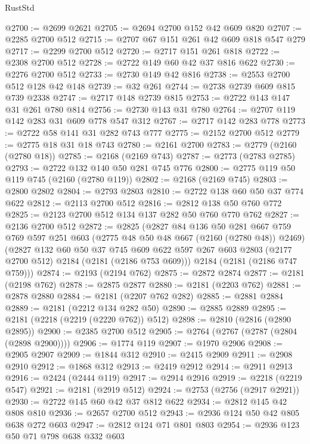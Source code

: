 \begin{lexlean}{RustStd}
\begin{coremodule}
@2700 := @2699 @2621
@2705 := @2694 @2700 @152 @42 @609 @820
@2707 := @2285 @2700 @512
@2715 := @2707 @67 @151 @261 @42 @609 @818 @547 @279
@2717 := @2299 @2700 @512
@2720 := @2717 @151 @261 @818
@2722 := @2308 @2700 @512
@2728 := @2722 @149 @60 @42 @37 @816 @622
@2730 := @2276 @2700 @512
@2733 := @2730 @149 @42 @816
@2738 := @2553 @2700 @512 @128 @42 @148
@2739 := @32 @261
@2744 := @2738 @2739 @609 @815 @739 @2338
@2747 := @2717 @148 @2739 @815
@2753 := @2722 @143 @147 @31 @261 @780 @814
@2756 := @2730 @143 @31 @780
@2764 := @2707 @119 @142 @283 @31 @609 @778 @547 @312
@2767 := @2717 @142 @283 @778
@2773 := @2722 @58 @141 @31 @282 @743 @777
@2775 := @2152 @2700 @512
@2779 := @2775 @18 @31 @18 @743
@2780 := @2161 @2700
@2783 := @2779 (@2160 (@2780 @18))
@2785 := @2168 (@2169 @743)
@2787 := @2773 (@2783 @2785)
@2793 := @2722 @132 @140 @50 @281 @745 @776
@2800 := @2775 @119 @50 @119 @745 (@2160 (@2780 @119))
@2802 := @2168 (@2169 @745)
@2803 := @2800 @2802
@2804 := @2793 @2803
@2810 := @2722 @138 @60 @50 @37 @774 @622
@2812 := @2113 @2700 @512
@2816 := @2812 @138 @50 @760 @772
@2825 := @2123 @2700 @512 @134 @137 @282 @50 @760 @770 @762
@2827 := @2136 @2700 @512
@2872 := @2825
    (@2827
      @84
      @136
      @50
      @281
      @667
      @759
      @769
      @597
      @251
      @603
      (@2775 @48 @50 @48 @667 (@2160 (@2780 @48)) @2469)
      (@2827
        @132
        @60
        @50
        @37
        @745
        @609
        @622
        @597
        @267
        @603
        @2803
        (@2177 @2700 @512)
        @2184
        (@2181 (@2186 @753 @609)))
      @2184
      (@2181 (@2186 @747 @759)))
@2874 := @2193 (@2194 @762)
@2875 := @2872 @2874
@2877 := @2181 (@2198 @762)
@2878 := @2875 @2877
@2880 := @2181 (@2203 @762)
@2881 := @2878 @2880
@2884 := @2181 (@2207 @762 @282)
@2885 := @2881 @2884
@2889 := @2181 (@2212 @134 @282 @50)
@2890 := @2885 @2889
@2895 := @2181 (@2218 (@2219 (@2220 @762)) @512)
@2898 := @2810 (@2816 (@2890 @2895))
@2900 := @2385 @2700 @512
@2905 := @2764 (@2767 (@2787 (@2804 (@2898 @2900))))
@2906 := @1774 @119
@2907 := @1970 @2906
@2908 := @2905 @2907
@2909 := @1844 @312
@2910 := @2415 @2909
@2911 := @2908 @2910
@2912 := @1868 @312
@2913 := @2419 @2912
@2914 := @2911 @2913
@2916 := @2424 (@2444 @119)
@2917 := @2914 @2916
@2919 := @2218 (@2219 @547)
@2921 := @2181 (@2919 @512)
@2924 := @2753 (@2756 (@2917 @2921))
@2930 := @2722 @145 @60 @42 @37 @812 @622
@2934 := @2812 @145 @42 @808 @810
@2936 := @2657 @2700 @512
@2943 := @2936 @124 @50 @42 @805 @638 @272 @603
@2947 := @2812 @124 @71 @801 @803
@2954 := @2936 @123 @50 @71 @798 @638 @332 @603

\end{coremodule}
\end{lexlean}
